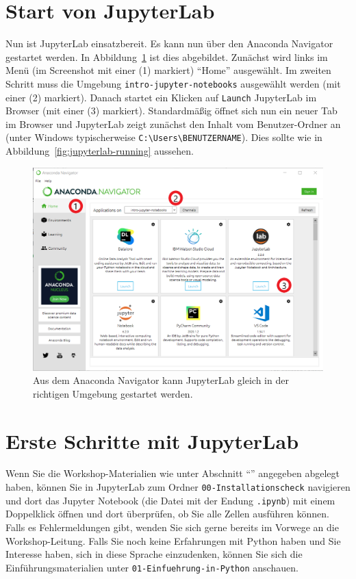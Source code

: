\documentclass{tufte-handout}
\begin{document}
\section{Start von JupyterLab}

Nun ist JupyterLab einsatzbereit.
Es kann nun über den Anaconda Navigator gestartet werden.
In Abbildung~\ref{fig:start-jupyterlab} ist dies abgebildet.
Zunächst wird links im Menü
(im Screenshot mit einer (1) markiert)
\enquote{Home} ausgewählt.
Im zweiten Schritt muss die Umgebung \texttt{intro-jupyter-notebooks} ausgewählt werden
(mit einer (2) markiert).
Danach startet ein Klicken auf \texttt{Launch} JupyterLab im Browser
(mit einer (3) markiert).
Standardmäßig öffnet sich nun ein neuer Tab im Browser und JupyterLab zeigt zunächst den Inhalt vom Benutzer-Ordner an (unter Windows typischerweise \texttt{C:\textbackslash{}Users\textbackslash{}BENUTZERNAME}).
Dies sollte wie in Abbildung~\ref{fig:jupyterlab-running} aussehen.

\begin{figure}[h]
  \includegraphics{anaconda-navigator-jupyterlab--mit-reihenfolge}
  \caption{Aus dem Anaconda Navigator kann JupyterLab gleich in der richtigen Umgebung gestartet werden.}%
\label{fig:start-jupyterlab}
\end{figure}

\section{Erste Schritte mit JupyterLab}

Wenn Sie die Workshop-Materialien wie unter Abschnitt \enquote{} angegeben  abgelegt haben, 
können Sie in JupyterLab zum Ordner 
\texttt{00-Installationscheck}
navigieren und dort das Jupyter Notebook (die Datei mit der Endung \texttt{.ipynb}) mit einem Doppelklick öffnen
und dort überprüfen, ob Sie alle Zellen ausführen können.
Falls es Fehlermeldungen gibt, wenden Sie sich gerne bereits im Vorwege an die Workshop-Leitung.
Falls Sie noch keine Erfahrungen mit Python haben und Sie Interesse haben, sich in diese Sprache einzudenken,
können Sie sich die Einführungsmaterialien unter
\texttt{01-Einfuehrung-in-Python}
anschauen.
\end{document}
